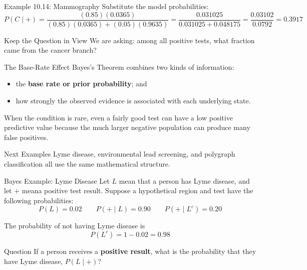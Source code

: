 \documentclass[aspectratio=169]{beamer}
\begin{document}
\begin{frame}{Example 10.14: Mammography}
Substitute the model probabilities:
$$P(C\mid +)=\frac{(0.85)(0.0365)}{(0.85)(0.0365)+(0.05)(0.9635)} = \frac{0.031025}{0.031025+0.048175} = \frac{0.03102}{0.0792} = \mathbf{0.3917}$$
  
\begin{alertblock}{Keep the Question in View}
We are asking: among all positive tests, what fraction came from the cancer branch?
\end{alertblock}
\end{frame}

\begin{frame}{The Base-Rate Effect}
Bayes's Theorem combines two kinds of information:
\begin{itemize}
	\item the \textbf{base rate or prior probability}; and
	\item how strongly the observed evidence is associated with each underlying state.
\end{itemize}
\vspace{0.2cm}
When the condition is rare, even a fairly good test can have a low positive predictive value because the much larger negative population can produce many false positives.

\begin{block}{Next Examples}
Lyme disease, environmental lead screening, and polygraph classification all use the same mathematical structure.
\end{block}
\end{frame}

\begin{frame}{Bayes Example: Lyme Disease}
Let $L$ mean that a person has Lyme disease, and let $+$ meana positive test result. Suppose a hypothetical region and test have the following probabilities:
$$P(L)=0.02 \qquad P(+\mid L)=0.90 \qquad P(+\mid L^c)=0.20$$

The probability of not having Lyme disease is
$$P(L^c)=1-0.02=0.98$$

\begin{block}{Question}
If a person receives a \textbf{positive result}, what is the probability that they have Lyme disease, $P(L\mid +)$?
\end{block}
\end{frame}
\end{document}
